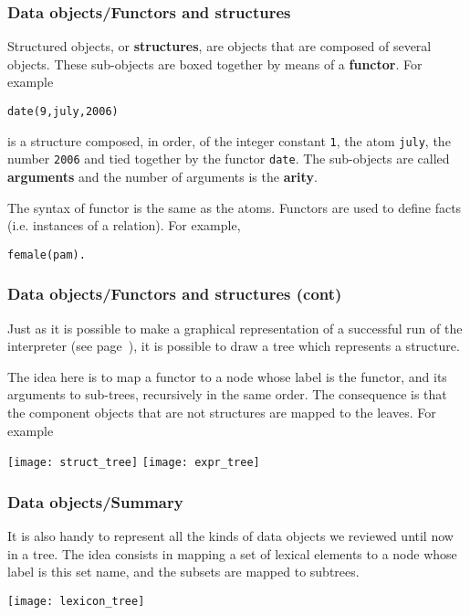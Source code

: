 %
\begin{frame}[containsverbatim]
\frametitle{Data objects/Functors and structures}

Structured objects, or \textbf{structures}, are objects that are
composed of several objects. These sub-objects are boxed together by
means of a \textbf{functor}. For example
{\small
\begin{verbatim}
date(9,july,2006)
\end{verbatim}
}
is a structure composed, in order, of the integer constant \texttt{1},
the atom \texttt{july}, the number \texttt{2006} and tied together by
the functor \texttt{date}. The sub-objects are called
\textbf{arguments} and the number of arguments is the \textbf{arity}.

\bigskip

The syntax of functor is the same as the atoms. Functors are used to
define facts (i.e. instances of a relation). For example,
{\small
\begin{verbatim}
female(pam).
\end{verbatim}
}

\end{frame}

%
\begin{frame}
\frametitle{Data objects/Functors and structures (cont)}
\label{structures_as_trees}

Just as it is possible to make a graphical representation of a
successful run of the \Prolog interpreter (see
page~\pageref{proof_trees}), it is possible to draw a tree which
represents a \Prolog structure.

\bigskip

The idea here is to map a functor to a node whose label is the
functor, and its arguments to sub-trees, recursively in the same
order. The consequence is that the component objects that are not
structures are mapped to the leaves. For example
\begin{center}
\texttt{[image: struct\_tree]}
\hspace{2cm}
\texttt{[image: expr\_tree]}
\end{center}

\end{frame}

%
\begin{frame}
\frametitle{Data objects/Summary}

It is also handy to represent all the kinds of \Prolog data objects we
reviewed until now in a tree. The idea consists in mapping a set of
lexical elements to a node whose label is this set name, and the
subsets are mapped to subtrees.
\begin{center}
\texttt{[image: lexicon\_tree]}
\end{center}

\end{frame}
